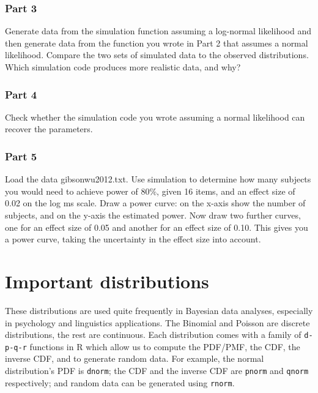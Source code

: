 \documentclass[12pt,]{krantz}
\begin{document}
\hypertarget{sec:SimulationexercisesPart3}{%
\subsection{Part 3}\label{sec:SimulationexercisesPart3}}

Generate data from the simulation function assuming a log-normal likelihood and then generate data from the function you wrote in Part 2 that assumes a normal likelihood. Compare the two sets of simulated data to the observed distributions. Which simulation code produces more realistic data, and why?

\hypertarget{sec:SimulationexercisesPart4}{%
\subsection{Part 4}\label{sec:SimulationexercisesPart4}}

Check whether the simulation code you wrote assuming a normal likelihood can recover the parameters.

\hypertarget{sec:SimulationexercisesPart5}{%
\subsection{Part 5}\label{sec:SimulationexercisesPart5}}

Load the data gibsonwu2012.txt. Use simulation to determine how many subjects you would need to achieve power of 80\%, given 16 items, and an effect size of 0.02 on the log ms scale. Draw a power curve: on the x-axis show the number of subjects, and on the y-axis the estimated power. Now draw two further curves, one for an effect size of 0.05 and another for an effect size of 0.10. This gives you a power curve, taking the uncertainty in the effect size into account.

\hypertarget{important-distributions}{%
\chapter{Important distributions}\label{important-distributions}}

These distributions are used quite frequently in Bayesian data analyses, especially in psychology and linguistics applications. The Binomial and Poisson are discrete distributions, the rest are continuous. Each distribution comes with a family of \texttt{d-p-q-r} functions in R which allow us to compute the PDF/PMF, the CDF, the inverse CDF, and to generate random data. For example, the normal distribution's PDF is \texttt{dnorm}; the CDF and the inverse CDF are \texttt{pnorm} and \texttt{qnorm} respectively; and random data can be generated using \texttt{rnorm}.
\end{document}
